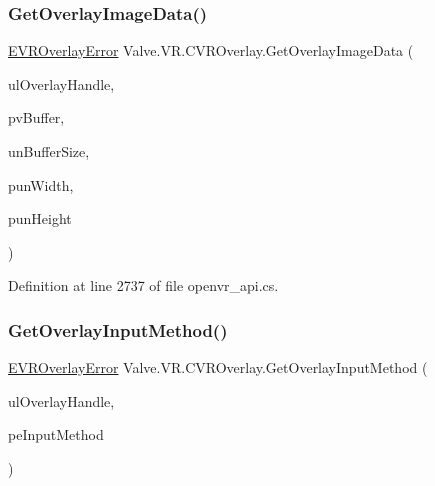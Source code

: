 \mbox{\label{class_valve_1_1_v_r_1_1_c_v_r_overlay_a7c2e857b9f28444253c53ed0d59d52b9}} 
\subsubsection{\texorpdfstring{GetOverlayImageData()}{GetOverlayImageData()}}
{\footnotesize\ttfamily \mbox{\hyperlink{namespace_valve_1_1_v_r_aaee5c5144f42b7969d45b854f51b0c18}{E\+V\+R\+Overlay\+Error}} Valve.\+V\+R.\+C\+V\+R\+Overlay.\+Get\+Overlay\+Image\+Data (\begin{DoxyParamCaption}\item[{ulong}]{ul\+Overlay\+Handle,  }\item[{Int\+Ptr}]{pv\+Buffer,  }\item[{uint}]{un\+Buffer\+Size,  }\item[{ref uint}]{pun\+Width,  }\item[{ref uint}]{pun\+Height }\end{DoxyParamCaption})}



Definition at line 2737 of file openvr\+\_\+api.\+cs.

\mbox{\label{class_valve_1_1_v_r_1_1_c_v_r_overlay_adc16b864ffaae52d5e294b1e2349b74f}} 
\subsubsection{\texorpdfstring{GetOverlayInputMethod()}{GetOverlayInputMethod()}}
{\footnotesize\ttfamily \mbox{\hyperlink{namespace_valve_1_1_v_r_aaee5c5144f42b7969d45b854f51b0c18}{E\+V\+R\+Overlay\+Error}} Valve.\+V\+R.\+C\+V\+R\+Overlay.\+Get\+Overlay\+Input\+Method (\begin{DoxyParamCaption}\item[{ulong}]{ul\+Overlay\+Handle,  }\item[{ref \mbox{\hyperlink{namespace_valve_1_1_v_r_a43f4e4c6980efb8b0d2a954640203d74}{V\+R\+Overlay\+Input\+Method}}}]{pe\+Input\+Method }\end{DoxyParamCaption})}



